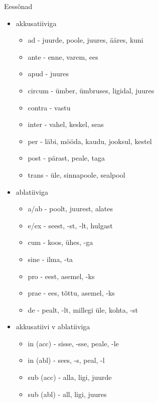 \documentclass[12pt]{article}
\newenvironment{tiitel}
	{\begin{center}
	\bfseries
	\large
	}{
	\end{center}
	}
\begin{document}
\pagebreak
\begin{tiitel}
Eessõnad
\end{tiitel}
\begin{itemize}
 \item akkusatiiviga
 \begin{itemize}
  \item ad - juurde, poole, juures, ääres, kuni
  \item ante - enne, varem, ees
  \item apud - juures
  \item circum - ümber, ümbruses, ligidal, juures
  \item contra - vastu
  \item inter - vahel, keskel, seas
  \item per - läbi, mööda, kaudu, jooksul, kestel
  \item post - pärast, peale, taga
  \item trans - üle, sinnapoole, sealpool
 \end{itemize}
 \item ablatiiviga
 \begin{itemize}
  \item a/ab - poolt, juurest, alates
  \item e/ex - seest, -st, -lt, hulgast
  \item cum - koos, ühes, -ga
  \item sine - ilma, -ta
  \item pro - eest, asemel, -ks
  \item prae - ees, tõttu, asemel, -ks
  \item de - pealt, -lt, millegi üle, kohta, -st
 \end{itemize}
 \item akkusatiivi v ablatiiviga
 \begin{itemize}
  \item in (acc) - sisse, -sse, peale, -le
  \item in (abl) - sees, -s, peal, -l
  \item sub (acc) - alla, ligi, juurde
  \item sub (abl) - all, ligi, juures
 \end{itemize}
\end{itemize}
\end{document}
